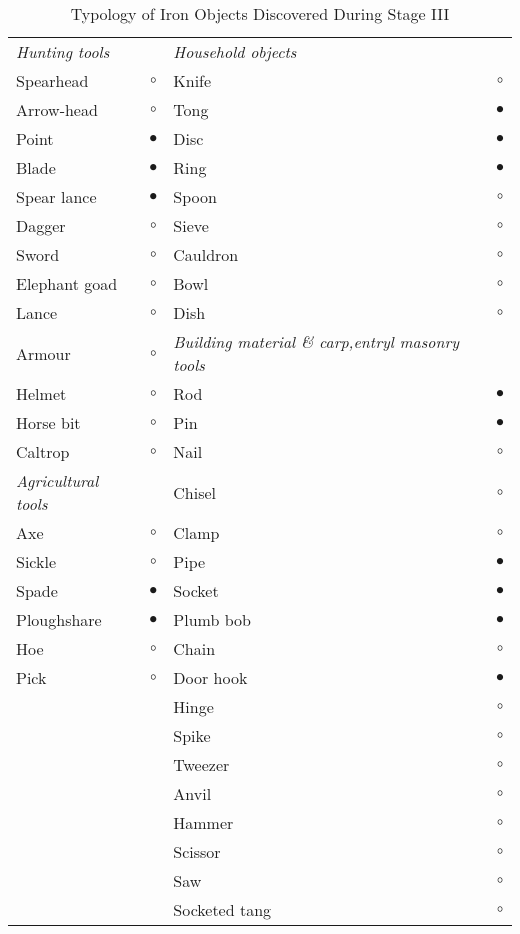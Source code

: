 {{\fontsize{8}{10}\selectfont
\begin{longtable}{|l|c|p{3cm}|c|}
\captionsetup{font=footnotesize}
\caption{Typology of Iron Objects Discovered During Stage III}\label{table IV.10}\\
\hline
{\it Hunting tools}  & & {\it Household objects} & \\
Spearhead & $\circ$ & Knife &$\circ$\\
Arrow-head & $\circ$& Tong &$\bullet$\\
Point& $\bullet$ & Disc &$\bullet$\\
Blade & $\bullet$ & Ring & $\bullet$\\
Spear lance & $\bullet$ & Spoon &$\circ$\\
Dagger & $\circ$ & Sieve & $\circ$ \\
Sword & $\circ$ & Cauldron &$\circ$\\
Elephant goad & $\circ$ & Bowl & $\circ$\\
Lance & $\circ$ & Dish & $\circ$\\
Armour & $\circ$ & {\it Building material \& carp,entryl masonry tools} & \\
Helmet & $\circ$ & Rod & $\bullet$\\
Horse bit & $\circ$ & Pin & $\bullet$\\
Caltrop & $\circ$ & Nail & $\circ$\\
{\it Agricultural tools} & &  Chisel & $\circ$\\
Axe & $\circ$ & Clamp & $\circ$ \\
Sickle & $\circ$ & Pipe &$\bullet$\\
Spade & $\bullet$ & Socket & $\bullet$\\
Ploughshare & $\bullet$ & Plumb bob & $\bullet$\\
Hoe & $\circ$ & Chain & $\circ$\\
Pick & $\circ$ & Door hook & $\bullet$\\
&& Hinge & $\circ$\\
&& Spike & $\circ$\\
&& Tweezer & $\circ$\\
&& Anvil & $\circ$\\
&&Hammer & $\circ$\\
&& Scissor & $\circ$\\
&&Saw & $\circ$\\
&& Socketed tang & $\circ$\\
\hline
\end{longtable}
}

\vspace{-.5cm}

}
